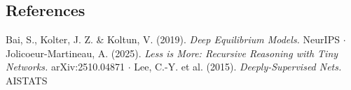 \documentclass[11pt]{article}
\begin{document}
\subsection*{References}



Bai, S., Kolter, J. Z. \& Koltun, V. (2019). \emph{Deep Equilibrium Models.} NeurIPS $\cdot$ Jolicoeur-Martineau, A. (2025). \emph{Less is More: Recursive Reasoning with Tiny Networks.} arXiv:2510.04871 $\cdot$ Lee, C.-Y. et al. (2015). \emph{Deeply-Supervised Nets.} AISTATS
\end{document}
